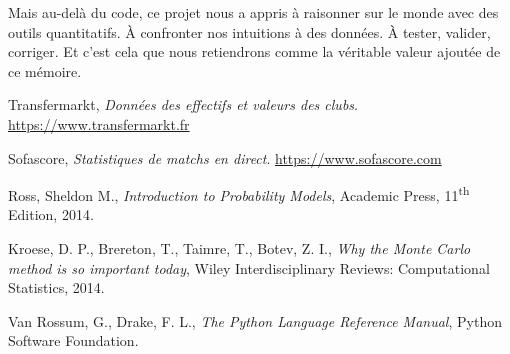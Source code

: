 \documentclass[12pt]{report}
\begin{document}
Mais au-delà du code, ce projet nous a appris à raisonner sur le monde avec des outils quantitatifs. À confronter nos intuitions à des données. À tester, valider, corriger. Et c’est cela que nous retiendrons comme la véritable valeur ajoutée de ce mémoire.


\vspace{-1em} %

\begin{thebibliography}{9}

Transfermarkt, \emph{Données des effectifs et valeurs des clubs}. \url{https://www.transfermarkt.fr}

Sofascore, \emph{Statistiques de matchs en direct}. \url{https://www.sofascore.com}

Ross, Sheldon M., \emph{Introduction to Probability Models}, Academic Press, 11\textsuperscript{th} Edition, 2014.

Kroese, D. P., Brereton, T., Taimre, T., Botev, Z. I., \emph{Why the Monte Carlo method is so important today}, Wiley Interdisciplinary Reviews: Computational Statistics, 2014.

Van Rossum, G., Drake, F. L., \emph{The Python Language Reference Manual}, Python Software Foundation.

\end{thebibliography}
\end{document}
